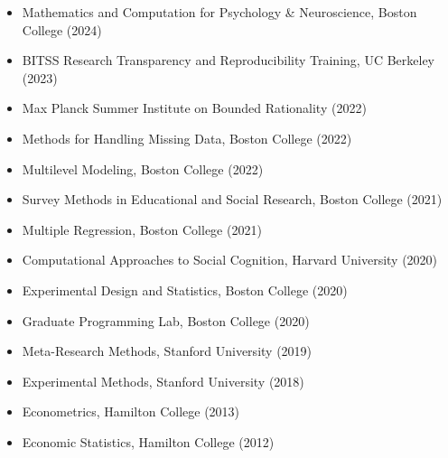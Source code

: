 \documentclass[11pt, letterpaper]{article}
\begin{document}
\begin{itemize}[itemsep=0.2em]
    \item Mathematics and Computation for Psychology \& Neuroscience, Boston College (2024)
    \item BITSS Research Transparency and Reproducibility Training, UC Berkeley (2023)
    \item Max Planck Summer Institute on Bounded Rationality (2022)
    \item Methods for Handling Missing Data, Boston College (2022)
    \item Multilevel Modeling, Boston College (2022)
    \item Survey Methods in Educational and Social Research, Boston College (2021)
    \item Multiple Regression, Boston College (2021)
    \item Computational Approaches to Social Cognition, Harvard University (2020)
    \item Experimental Design and Statistics, Boston College (2020)
    \item Graduate Programming Lab, Boston College (2020)
    \item Meta-Research Methods, Stanford University (2019)
    \item Experimental Methods, Stanford University (2018)
    \item Econometrics, Hamilton College (2013)
    \item Economic Statistics, Hamilton College (2012)
\end{itemize}
\end{document}
